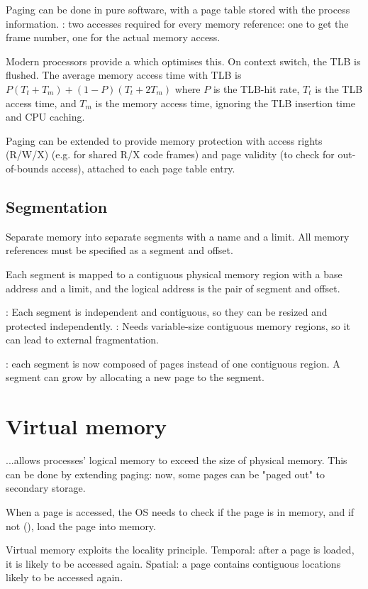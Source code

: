 \documentclass[fontsize=9pt]{slnotes}
\newcommand\benefits{\checkmark}
\newcommand\problems{\textsymbol{✗}}
\begin{document}
Paging can be done in pure software, with a page table stored with the process information. \problems: two accesses required for every memory reference: one to get the frame number, one for the actual memory access.

Modern processors provide a  which optimises this. On context switch, the TLB is flushed. The average memory access time with TLB is \(P (T_t + T_m) + (1 - P) (T_t + 2T_m)\) where \(P\) is the TLB-hit rate, \(T_t\) is the TLB access time, and \(T_m\) is the memory access time, ignoring the TLB insertion time and CPU caching.

Paging can be extended to provide memory protection with access rights (R/W/X) (e.g. for shared R/X code frames) and page validity (to check for out-of-bounds access), attached to each page table entry.

\subsection{Segmentation}
Separate memory into separate segments with a name and a limit. All memory references must be specified as a segment and offset.

Each segment is mapped to a contiguous physical memory region with a base address and a limit, and the logical address is the pair of segment and offset.

\benefits: Each segment is independent and contiguous, so they can be resized and protected independently. \problems: Needs variable-size contiguous memory regions, so it can lead to external fragmentation.

: each segment is now composed of pages instead of one contiguous region. A segment can grow by allocating a new page to the segment.

\section{Virtual memory}
...allows processes' logical memory to exceed the size of physical memory. This can be done by extending paging: now, some pages can be "paged out" to secondary storage.

When a page is accessed, the OS needs to check if the page is in memory, and if not (), load the page into memory.

Virtual memory exploits the locality principle. Temporal: after a page is loaded, it is likely to be accessed again. Spatial: a page contains contiguous locations likely to be accessed again.
\end{document}
